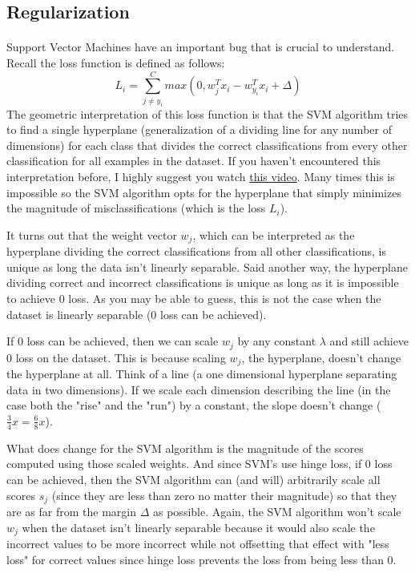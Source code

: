 \documentclass[12pt]{article}
\begin{document}
\subsection{Regularization}

\paragraph{}
Support Vector Machines have an important bug that is crucial to understand. Recall the 
loss function is defined as follows: 
\begin{equation}
    L_{i} = \sum_{j \neq y_{i}}^C max(0, w_{j}^T x_i - w_{y_i}^T x_i + \Delta)
\end{equation}
The geometric interpretation of this loss function is that the SVM algorithm tries to find a single 
hyperplane (generalization of a dividing line for any number of dimensions) 
for each class that divides the correct classifications from every other 
classification for all examples in the dataset. If you haven't encountered this 
interpretation before, I highly suggest you watch \href{https://www.youtube.com/watch?v=efR1C6CvhmE}{this video}. 
Many times this is impossible so the SVM algorithm opts for the hyperplane that 
simply minimizes the magnitude of misclassifications (which is the loss $L_i$). 

It turns out that the weight vector $w_j$, which can be interpreted as the hyperplane dividing
the correct classifications from all other classifications, is unique as long the data
isn't linearly separable. Said another way, the hyperplane dividing correct and incorrect 
classifications is unique as long as it is impossible to achieve 0 loss.
As you may be able to guess, this is not the case when the dataset is linearly 
separable (0 loss can be achieved). 

If 0 loss can be achieved, then we can scale $w_j$ by any constant $\lambda$ and still
achieve 0 loss on the dataset. This is because scaling $w_j$, the hyperplane, doesn't change
the hyperplane at all. Think of a line (a one dimensional hyperplane separating data
in two dimensions). If we scale each dimension describing the line (in the case both the "rise"
and the "run") by a constant, the slope doesn't change ($\frac{3}{4}x = \frac{6}{8}x$).

What does change for the SVM algorithm is the magnitude of the scores computed using
those scaled weights. And since SVM's use hinge loss, if 0 loss can be achieved, 
then the SVM algorithm can (and will) arbitrarily scale all scores $s_j$ (since they are less
than zero no matter their magnitude) so that they are as far from the margin $\Delta$ 
as possible. Again, the SVM algorithm won't scale $w_j$ when the dataset isn't linearly 
separable because it would also scale the incorrect values to be more incorrect while not 
offsetting that effect with "less loss" for correct values since hinge loss prevents the 
loss from being less than 0. 
\end{document}
